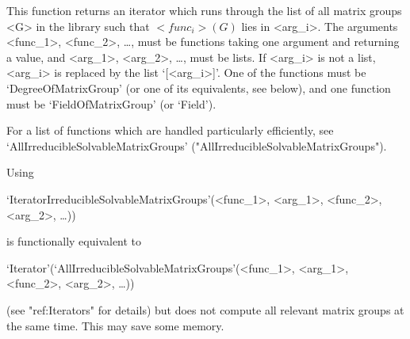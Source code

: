 This function returns an iterator which runs through the list of all matrix groups <G>
in the  {\IRREDSOL} library such that
$<func_i>(G)$ lies in <arg_i>. The arguments <func_1>, <func_2>, \dots,
must be {\GAP} functions taking one argument and returning a value, and <arg_1>, <arg_2>, \dots, 
must be lists. If <arg_i> is not a list, <arg_i> is replaced by the list `[<arg_i>]'.
One of the functions must be `DegreeOfMatrixGroup' (or one of its equivalents, see below), and one
function must be  `FieldOfMatrixGroup' (or `Field'). 

For a list of functions which are handled particularly efficiently, see
`AllIrreducibleSolvableMatrixGroups' ("AllIrreducibleSolvableMatrixGroups").

Using 

`IteratorIrreducibleSolvableMatrixGroups'(<func_1>, <arg_1>, <func_2>, <arg_2>, \dots)) 

is functionally equivalent to 

`Iterator'(`AllIrreducibleSolvableMatrixGroups'(<func_1>, <arg_1>, <func_2>, <arg_2>, \dots))

(see "ref:Iterators" for details) but does not compute all relevant matrix groups at the same time. 
This may save some memory. 




